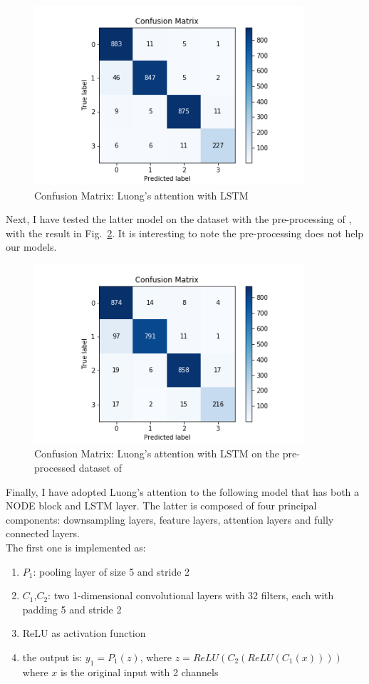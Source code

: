 \documentclass[LaM,binding=0.6cm]{sapthesis}
\begin{document}
\begin{figure}[H]  \centering
	\includegraphics[width=100mm,scale=0.7]{lstmat2}
	\caption{Confusion Matrix: Luong's attention with LSTM}
	\label{fig:lstmat2}
\end{figure}
Next, I have tested the latter model on the dataset with the pre-processing of \cite{cnnfazeli}, with the result in Fig.~\ref{fig:lstmatcnn}. It is interesting to note the pre-processing does not help our models.
\begin{figure}[H]  \centering
	\includegraphics[width=100mm,scale=0.7]{lstmatcnn}
	\caption{Confusion Matrix: Luong's attention with LSTM on the pre-processed dataset of \cite{cnnfazeli}}
	\label{fig:lstmatcnn}
\end{figure}
Finally, I have adopted Luong's attention to the following model that has both a NODE block and LSTM layer. The latter is composed of four principal components: downsampling layers, feature layers, attention layers and fully connected layers.\\The first one is implemented as:
\begin{enumerate}
\item $P_1$: pooling layer of size 5 and stride 2
\item $C_1$,$C_2$: two 1-dimensional convolutional layers with 32 filters, each with padding 5 and stride 2
\item ReLU as activation function
\item the output is: $y_1=P_1(z)$, where $z=ReLU(C_2(ReLU(C_1(x))))$ where $x$ is the original input with 2 channels
\end{enumerate}
\end{document}
